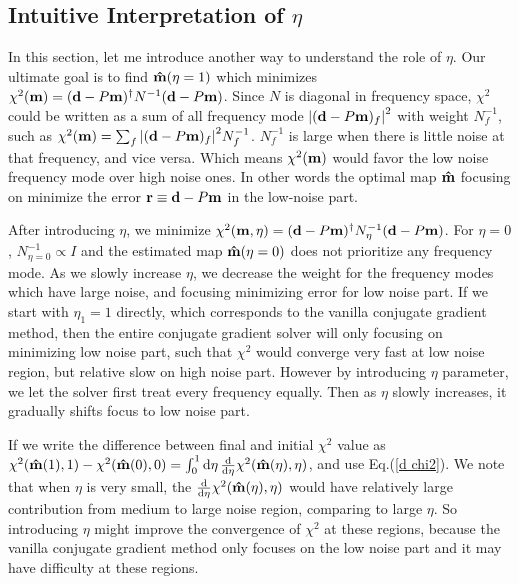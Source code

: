 \documentclass[twocolumn,linenumbers]{aastex631}
\newcommand{\vbd}{\vb{d}}
\newcommand{\vbm}{\vb{m}}
\newcommand{\inv}[1]{#1^{-1}}
\newcommand{\hatm}{\vb{\hat{m}}}
\newcommand{\Nbar}{\bar{N}}
\newcommand{\Neta}{N_{\eta}}
\begin{document}
\subsection{Intuitive Interpretation of $\eta$}\label{intuitive interp}
In this section, let me introduce another way to understand the role of $\eta$.
Our ultimate goal is to find $\hatm(\eta=1)$ which minimizes 
$\chi^2(\vbm) = (\vbd - P\vbm)^{\dagger} \inv{N} (\vbd - P\vbm)$.
Since $N$ is diagonal in frequency space,
$\chi^2$ could be written as a sum of all frequency mode 
$\qty|(\vbd-P\vbm)_f|^2$ with weight $\inv{N}_f$, such as
$\chi^2(\vbm) = \sum_f \qty|(\vbd-P\vbm)_f|^2 \inv{N}_f$.
$\inv{N}_f$ is large when there is little noise at that frequency,
and vice versa.
Which means $\chi^2(\vbm)$ would favor the low noise frequency mode over high 
noise ones.
In other words the optimal map $\hatm$ focusing on minimize the error
$\vb{r} \equiv \vbd - P\vbm$ in the low-noise part.

After introducing $\eta$, we minimize
$\chi^2(\vbm,\eta)=(\vbd-P\vbm)^{\dagger} N_{\eta}^{-1} (\vbd - P\vbm)$.
For $\eta=0$, $N^{-1}_{\eta=0} \propto I$ and the estimated map $\hatm(\eta=0)$
does not prioritize any frequency mode.
As we slowly increase $\eta$, we decrease the weight for the frequency modes
which have large noise, and focusing minimizing error for low noise part.
If we start with $\eta_1=1$ directly, which corresponds to the vanilla conjugate
gradient method, then the entire conjugate gradient solver
will only focusing on minimizing low noise part, such that $\chi^2$ would
converge very fast at low noise region, but relative slow on high noise part.
However by introducing $\eta$ parameter, we let the solver first treat every
frequency equally.
Then as $\eta$ slowly increases, it gradually shifts focus to low noise
part.

If we write the difference between final and initial $\chi^2$ value as
$\chi^2(\hatm(1),1) - \chi^2(\hatm(0),0) = \int_0^1 \dd{\eta}
\dv{\eta} \chi^2(\hatm(\eta),\eta)$,
and use Eq.(\ref{d chi2}).
We note that when $\eta$ is very small, 
the $\dv{\eta}\chi^2(\hatm(\eta),\eta)$ would have relatively large
contribution from medium to large noise region, comparing to large $\eta$.
So introducing $\eta$ might improve the convergence of $\chi^2$ at these
regions, because the vanilla conjugate gradient method only focuses on the low noise
part and it may have difficulty at these regions.
\end{document}
